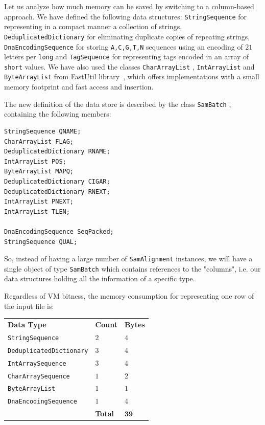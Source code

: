 \documentclass[a4paper,twoside]{article}
\begin{document}
Let us analyze how much memory can be saved by switching to a column-based approach.
We have defined the following data structures: {\texttt{StringSequence} } for representing in a compact manner a collection of strings, {\texttt{DeduplicatedDictionary} } for eliminating duplicate copies of repeating strings, {\texttt{DnaEncodingSequence} } for storing {\texttt{A,C,G,T,N} } sequences using an encoding of $21$ letters per {\texttt{long} } and {\texttt{TagSequence} } for representing tags encoded in an array of {\texttt{short} } values.
We have also used the classes {\texttt{CharArrayList} }, {\texttt{IntArrayList} } and {\texttt{ByteArrayList} } from FastUtil library~\cite{fastutil}, which offers implementations with a small memory footprint and fast access and insertion.

The new definition of the data store is described by the class {\texttt{SamBatch} }, containing the following members:
\begin{small}
\begin{verbatim}
StringSequence QNAME;
CharArrayList FLAG;
DeduplicatedDictionary RNAME;
IntArrayList POS;
ByteArrayList MAPQ;
DeduplicatedDictionary CIGAR;
DeduplicatedDictionary RNEXT;
IntArrayList PNEXT;
IntArrayList TLEN;

DnaEncodingSequence SeqPacked;
StringSequence QUAL;
\end{verbatim}
\end{small}

So, instead of having a large number of {\texttt{SamAlignment} } instances, we will have a single object of type {\texttt{SamBatch} } which contains references to the "columns", i.e. our data structures holding all the information of a specific type.


Regardless of VM bitness, the memory consumption for representing one row of the input file is: 
\begin{center}
\begin{tabular}{ l l l }
 {\textbf{Data Type} } 				& {\textbf{Count} } 		& {\textbf{Bytes} } \\
 {\texttt{StringSequence} } 			& $2$ 				& $4$ \\
 {\texttt{DeduplicatedDictionary} }	& $3$ 				& $4$ \\
 {\texttt{IntArraySequence} }			& $3$		 		& $4$ \\
 {\texttt{CharArraySequence} }		& $1$				& $2$ \\
 {\texttt{ByteArrayList} }			& $1$				& $1$ \\
 {\texttt{DnaEncodingSequence} }	 	& $1$ 				& $4$ \\
 								& {\textbf{Total} }		& $\mathbf{39}$
\end{tabular}
\end{center}
\end{document}
